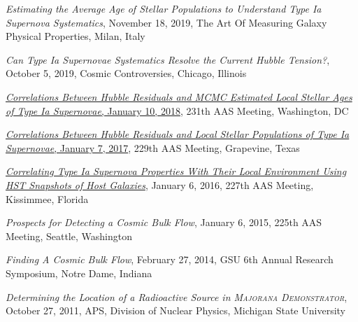 \documentclass[margin]{res}
\begin{document}
\begin{resume}
\hangindent=15pt 
{\sl Estimating the Average Age of Stellar Populations to Understand Type Ia Supernova Systematics}, November 18, 2019, The Art Of Measuring Galaxy Physical Properties, Milan, Italy
\vspace{-12pt}
\vspace{-12pt}

\hangindent=15pt 
{\sl Can Type Ia Supernovae Systematics Resolve the Current Hubble Tension?}, October 5, 2019, Cosmic Controversies, Chicago, Illinois
\vspace{-12pt}

\hangindent=15pt 
\href{https://ui.adsabs.harvard.edu/#abs/2018AAS...23124512R/abstract}{{\sl Correlations Between Hubble Residuals and MCMC Estimated Local Stellar Ages of Type Ia Supernovae}, January 10, 2018}, 231th AAS Meeting, Washington, DC
\vspace{-12pt}


\hangindent=15pt 
\href{https://ui.adsabs.harvard.edu/#abs/2017AAS...22943402R/abstract}{{\sl Correlations Between Hubble Residuals and Local Stellar Populations of Type Ia Supernovae}, January 7, 2017}, 229th AAS Meeting, Grapevine, Texas
\vspace{-12pt}

\hangindent=15pt 
\href{https://ui.adsabs.harvard.edu/#abs/2016AAS...22723711R/abstract}{{\sl Correlating Type Ia Supernova Properties With Their Local Environment Using HST Snapshots of Host Galaxies}}, January 6, 2016, 227th AAS Meeting, Kissimmee, Florida
\vspace{-12pt}

\hangindent=15pt 
{\sl Prospects for Detecting a Cosmic Bulk Flow},  January 6, 2015, 225th AAS Meeting, Seattle, Washington 
\vspace{-12pt}

\hangindent=15pt 
{\sl Finding A Cosmic Bulk Flow}, February 27, 2014, GSU 6th Annual Research Symposium, Notre Dame, Indiana
\vspace{-12pt}

\hangindent=15pt 
{\sl Determining the Location of a Radioactive Source in \textsc{Majorana Demonstrator}}, October 27, 2011, APS, Division of Nuclear Physics, Michigan State University 



\end{resume}
\end{document}
